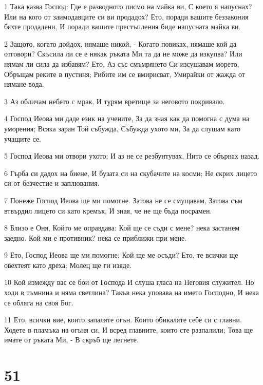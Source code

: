 \par 1 Така казва Господ: Где е разводното писмо на майка ви, С което я напуснах? Или на кого от заимодавците си ви продадох? Ето, поради вашите беззакония бяхте продадени, И поради вашите престъпления биде напусната майка ви.
\par 2 Защото, когато дойдох, нямаше никой, - Когато повиках, нямаше кой да отговори? Скъсила ли се е някак ръката Ми та да не може да изкупва? Или нямам ли сила да избавям? Ето, Аз със смъмрянето Си изсушавам морето, Обръщам реките в пустиня; Рибите им се вмирисват, Умирайки от жажда от нямане вода.
\par 3 Аз обличам небето с мрак, И турям вретище за неговото покривало.
\par 4 Господ Иеова ми даде език на учените, За да зная как да помогна с дума на уморения; Всяка заран Той събужда, Събужда ухото ми, За да слушам като учащите се.
\par 5 Господ Иеова ми отвори ухото; И аз не се резбунтувах, Нито се обърнах назад.
\par 6 Гърба си дадох на биене, И бузата си на скубачите на косми; Не скрих лицето си от безчестие и заплювания.
\par 7 Понеже Господ Иеова ще ми помогне. Затова не се смущавам, Затова съм втвърдил лицето си като кремък, И зная, че не ще бъда посрамен.
\par 8 Близо е Оня, Който ме оправдава: Кой ще се съди с мене? нека застанем заедно. Кой ми е противник? нека се приближи при мене.
\par 9 Ето, Господ Иеова ще ми помогне; Кой ще ме осъди? Ето, те всички ще овехтеят като дреха; Молец ще ги изяде.
\par 10 Кой измежду вас се бои от Господа И слуша гласа на Неговия служител. Но ходи в тъмнина и няма светлина? Такъв нека уповава на името Господно, И нека се обляга на своя Бог.
\par 11 Ето, всички вие, които запаляте огън. Които обикаляте себе си с главни. Ходете в пламъка на огъня си, И всред главните, които сте разпалили; Това ще имате от ръката Ми, - В скръб ще легнете.

\chapter{51}

